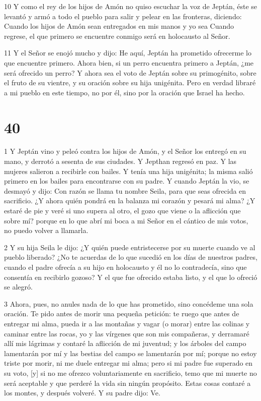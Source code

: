 \par 10 Y como el rey de los hijos de Amón no quiso escuchar la voz de Jeptán, éste se levantó y armó a todo el pueblo para salir y pelear en las fronteras, diciendo: Cuando los hijos de Amón sean entregados en mis manos y yo sea Cuando regrese, el que primero se encuentre conmigo será en holocausto al Señor.

\par 11 Y el Señor se enojó mucho y dijo: He aquí, Jeptán ha prometido ofrecerme lo que encuentre primero. Ahora bien, si un perro encuentra primero a Jeptán, ¿me será ofrecido un perro? Y ahora sea el voto de Jeptán sobre su primogénito, sobre el fruto de su vientre, y su oración sobre su hija unigénita. Pero en verdad libraré a mi pueblo en este tiempo, no por él, sino por la oración que Israel ha hecho.

\chapter{40}

\par 1 Y Jeptán vino y peleó contra los hijos de Amón, y el Señor los entregó en su mano, y derrotó a sesenta de sus ciudades. Y Jepthan regresó en paz. Y las mujeres salieron a recibirle con bailes. Y tenía una hija unigénita; la misma salió primero en los bailes para encontrarse con su padre. Y cuando Jeptán la vio, se desmayó y dijo: Con razón se llama tu nombre Seila, para que seas ofrecida en sacrificio. ¿Y ahora quién pondrá en la balanza mi corazón y pesará mi alma? ¿Y estaré de pie y veré si uno supera al otro, el gozo que viene o la aflicción que sobre mí? porque en lo que abrí mi boca a mi Señor en el cántico de mis votos, no puedo volver a llamarla.

\par 2 Y su hija Seila le dijo: ¿Y quién puede entristecerse por su muerte cuando ve al pueblo liberado? ¿No te acuerdas de lo que sucedió en los días de nuestros padres, cuando el padre ofrecía a su hijo en holocausto y él no lo contradecía, sino que consentía en recibirlo gozoso? Y el que fue ofrecido estaba listo, y el que lo ofreció se alegró.

\par 3 Ahora, pues, no anules nada de lo que has prometido, sino concédeme una sola oración. Te pido antes de morir una pequeña petición: te ruego que antes de entregar mi alma, pueda ir a las montañas y vagar (o morar) entre las colinas y caminar entre las rocas, yo y las vírgenes que son mis compañeras, y derramaré allí mis lágrimas y contaré la aflicción de mi juventud; y los árboles del campo lamentarán por mí y las bestias del campo se lamentarán por mí; porque no estoy triste por morir, ni me duele entregar mi alma; pero si mi padre fue superado en su voto, [y] si no me ofrezco voluntariamente en sacrificio, temo que mi muerte no será aceptable y que perderé la vida sin ningún propósito. Estas cosas contaré a los montes, y después volveré. Y su padre dijo: Ve.

